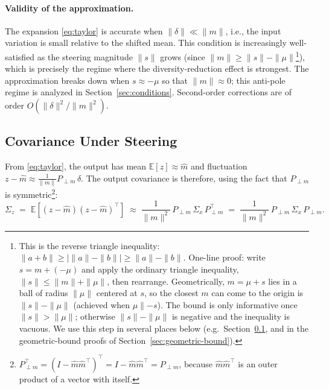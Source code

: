 \paragraph{Validity of the approximation.}
The expansion \eqref{eq:taylor} is accurate when $\|\delta\| \ll \|m\|$, i.e., the input variation is small relative to the shifted mean.
This condition is increasingly well-satisfied as the steering magnitude $\|s\|$ grows (since $\|m\| \geq \|s\| - \|\mu\|$\footnote{%
  This is the reverse triangle inequality:
  $\|a + b\| \geq \bigl|\|a\|-\|b\|\bigr| \geq \|a\|-\|b\|$.
  One-line proof: write $s = m + (-\mu)$ and apply the ordinary triangle inequality,
  $\|s\| \leq \|m\| + \|\mu\|$, then rearrange.
  Geometrically, $m = \mu + s$ lies in a ball of radius $\|\mu\|$ centered at $s$, so
  the closest $m$ can come to the origin is $\|s\| - \|\mu\|$ (achieved when $\mu \parallel -s$).
  The bound is only informative once $\|s\| > \|\mu\|$; otherwise $\|s\|-\|\mu\|$ is negative
  and the inequality is vacuous.
  We use this step in several places below (e.g.\ Section~\ref{sec:covariance}, and in the
  geometric-bound proofs of Section~\ref{sec:geometric-bound}).%
}), which is precisely the regime where the diversity-reduction effect is strongest.
The approximation breaks down when $s \approx -\mu$ so that $\|m\| \approx 0$; this anti-pole regime is analyzed in Section~\ref{sec:conditions}.
Second-order corrections are of order $O(\|\delta\|^2 / \|m\|^2)$.

\subsection{Covariance Under Steering}
\label{sec:covariance}

From \eqref{eq:taylor}, the output has mean $\mathbb{E}[z] \approx \hat{m}$ and fluctuation $z - \hat{m} \approx \frac{1}{\|m\|}P_{\perp m}\,\delta$.
The output covariance is therefore, using the fact that $P_{\perp m}$ is
symmetric\footnote{%
  $P_{\perp m}^\top = (I - \hat{m}\hat{m}^\top)^\top = I - \hat{m}\hat{m}^\top = P_{\perp m}$,
  because $\hat{m}\hat{m}^\top$ is an outer product of a vector with itself.%
}:
%
\begin{equation}
  \Sigma_z
  \;=\; \mathbb{E}\!\left[(z - \hat{m})(z - \hat{m})^\top\right]
  \;\approx\; \frac{1}{\|m\|^2}\,P_{\perp m}\,\Sigma_x\,P_{\perp m}^\top
  \;=\; \frac{1}{\|m\|^2}\,P_{\perp m}\,\Sigma_x\,P_{\perp m}.
  \label{eq:output-cov-simplified}
\end{equation}

